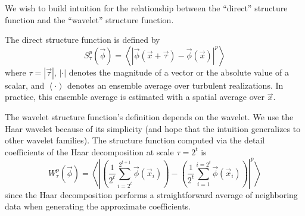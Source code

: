 \documentclass{article}
\begin{document}

We wish to build intuition for the relationship between the ``direct'' structure function and the ``wavelet'' structure function.

The direct structure function is defined by
\begin{equation}
    S^p_\tau(\vec{\phi}) = \left< \left| \vec{\phi}(\vec{x} + \vec{\tau}) - \vec{\phi}(\vec{x}) \right|^p \right>
\end{equation}
where $\tau = |\vec{\tau}|$, $|\cdot|$ denotes the magnitude of a vector or the absolute value of a scalar, and $\left< \cdot \right>$ denotes an ensemble average over turbulent realizations.
In practice, this ensemble average is estimated with a spatial average over $\vec{x}$.

The wavelet structure function's definition depends on the wavelet.
We use the Haar wavelet because of its simplicity (and hope that the intuition generalizes to other wavelet families).
The structure function computed via the detail coefficients of the Haar decomposition at scale $\tau = 2^t$ is
\begin{equation}
    W^p_\tau(\vec{\phi}) = \left< \left| \left(\frac{1}{2^t}\sum\limits_{i=2^t}^{2^{t+1}} \vec{\phi}(\vec{x}_i)\right) - \left(\frac{1}{2^t}\sum\limits_{i=1}^{i=2^t} \vec{\phi}(\vec{x}_i)\right)\right|^p \right>
\end{equation}
since the Haar decomposition performs a straightforward average of neighboring data when generating the approximate coefficients.
\end{document}
